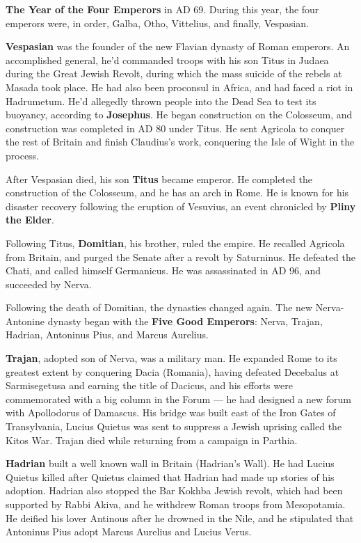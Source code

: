 \textbf{The Year of the Four Emperors} in AD 69. During this year, the four emperors were, in order,
Galba, Otho, Vittelius, and finally, Vespasian.

\textbf{Vespasian} was the founder of the new Flavian dynasty of Roman emperors.
An accomplished general, he'd commanded troops with his son Titus in Judaea during the Great Jewish Revolt,
during which the mass suicide of the rebels at Masada took place.
He had also been proconsul in Africa, and had faced a riot in Hadrumetum.
He'd allegedly thrown people into the Dead Sea to test its buoyancy, according to \textbf{Josephus}.
He began construction on the Colosseum, and construction was completed in AD 80 under Titus.
He sent Agricola to conquer the rest of Britain and finish Claudius's work,
conquering the Isle of Wight in the process.

After Vespasian died, his son \textbf{Titus} became emperor.
He completed the construction of the Colosseum, and he has an arch in Rome.
He is known for his disaster recovery following the eruption of Vesuvius,
an event chronicled by \textbf{Pliny the Elder}.

Following Titus, \textbf{Domitian}, his brother, ruled the empire.
He recalled Agricola from Britain, and purged the Senate after a revolt by Saturninus.
He defeated the Chati, and called himself Germanicus.
He was assassinated in AD 96, and succeeded by Nerva.

Following the death of Domitian, the dynasties changed again.
The new Nerva-Antonine dynasty began with the \textbf{Five Good Emperors}:
Nerva, Trajan, Hadrian, Antoninus Pius, and Marcus Aurelius.

\textbf{Trajan}, adopted son of Nerva, was a military man.
He expanded Rome to its greatest extent by conquering Dacia (Romania),
having defeated Decebalus at Sarmisegetusa and earning the title of Dacicus,
and his efforts were commemorated with a big column in the Forum ---
he had designed a new forum with Apollodorus of Damascus.
His bridge was built east of the Iron Gates of Transylvania,
Lucius Quietus was sent to suppress a Jewish uprising called the Kitos War.
Trajan died while returning from a campaign in Parthia.

\textbf{Hadrian} built a well known wall in Britain (Hadrian's Wall).
He had Lucius Quietus killed after Quietus claimed that Hadrian had made up stories of his adoption.
Hadrian also stopped the Bar Kokhba Jewish revolt, which had been supported by Rabbi Akiva,
and he withdrew Roman troops from Mesopotamia.
He deified his lover Antinous after he drowned in the Nile,
and he stipulated that Antoninus Pius adopt Marcus Aurelius and Lucius Verus.

